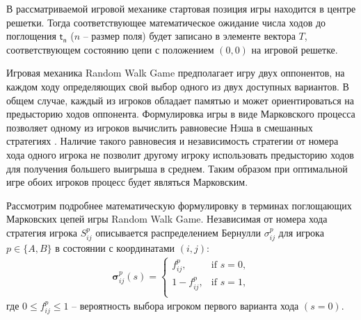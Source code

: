 В рассматриваемой игровой механике стартовая позиция игры находится в центре решетки. Тогда соответствующее математическое ожидание числа ходов до поглощения $\boldsymbol{\mathsf{t_n}}$ ($n$ -- размер поля) будет записано в элементе вектора $T$, соответствующем состоянию цепи с положением $(0, 0)$ на игровой решетке.

Игровая механика Random Walk Game предполагает игру двух оппонентов, на каждом ходу определяющих свой выбор одного из двух доступных вариантов. В общем случае, каждый из игроков обладает памятью и может ориентироваться на предысторию ходов оппонента. Формулировка игры в виде Марковского процесса позволяет одному из игроков вычислить равновесие Нэша в смешанных стратегиях \cite{nash_non-cooperative_1951}. Наличие такого равновесия и независимость стратегии от номера хода одного игрока не позволит другому игроку использовать предысторию ходов для получения большего выигрыша в среднем. Таким образом при оптимальной игре обоих игроков процесс будет являться Марковским.

Рассмотрим подробнее математическую формулировку в терминах поглощающих Марковских цепей игры Random Walk Game. Независимая от номера хода стратегия игрока $S_{ij}^p$ описывается распределением Бернулли $\sigma_{ij}^p$ для игрока $p \in \{A, B\}$ в состоянии с координатами $(i, j)$:
\begin{equation}
    \begin{aligned}
    \boldsymbol{\sigma}_{ij}^p(s)=
    \begin{cases}
        f_{ij}^p, &\mbox{if } s = 0,\\ 
        1-f_{ij}^p, &\mbox{if } s = 1,\\
    \end{cases}
    \label{eq:sigma}
    \end{aligned}
\end{equation}
где $0 \leq f_{ij}^p \leq 1$ -- вероятность выбора игроком первого варианта хода $(s=0)$.

